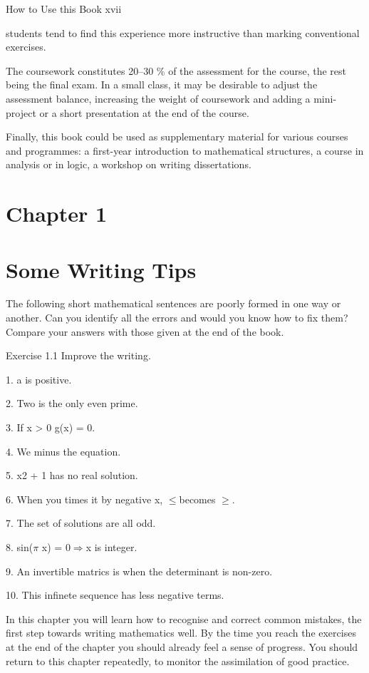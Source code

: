 \documentclass[11pt]{article}
\theoremstyle{plain}
\theoremstyle{definition}
\begin{document}
How to Use this Book xvii

students tend to find this experience more instructive than marking conventional exercises.

The coursework constitutes 20--30 \% of the assessment for the course, the rest being the final exam. In a small class, it may be desirable to adjust the assessment balance, increasing the weight of coursework and adding a mini-project or a short presentation at the end of the course.

Finally, this book could be used as supplementary material for various courses and programmes: a first-year introduction to mathematical structures, a course in analysis or in logic, a workshop on writing dissertations.

\section{Chapter 1}

\section{Some Writing Tips}

The following short mathematical sentences are poorly formed in one way or another. Can you identify all the errors and would you know how to fix them? Compare your answers with those given at the end of the book.

Exercise 1.1 Improve the writing.

1. a is positive.

2. Two is the only even prime.

3. If x > 0 g(x) = 0.

4. We minus the equation.

5. x2 + 1 has no real solution.

6. When you times it by negative x, $\leq$becomes $\geq$.

7. The set of solutions are all odd.

8. sin($\pi$ x) = 0$\Rightarrow$x is integer.

9. An invertible matrics is when the determinant is non-zero.

10. This infinete sequence has less negative terms.

In this chapter you will learn how to recognise and correct common mistakes, the first step towards writing mathematics well. By the time you reach the exercises at the end of the chapter you should already feel a sense of progress. You should return to this chapter repeatedly, to monitor the assimilation of good practice.
\end{document}
